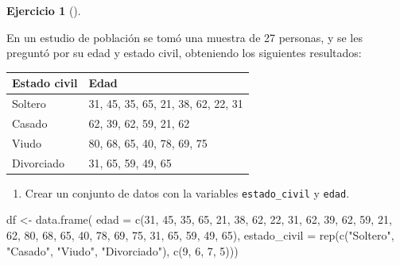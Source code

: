 \documentclass[
  a4paper,
]{scrreport}
\newenvironment{Shaded}{\begin{snugshade}}{\end{snugshade}}
\newcommand{\AttributeTok}[1]{\textcolor[rgb]{0.40,0.45,0.13}{#1}}
\newcommand{\DecValTok}[1]{\textcolor[rgb]{0.68,0.00,0.00}{#1}}
\newcommand{\FunctionTok}[1]{\textcolor[rgb]{0.28,0.35,0.67}{#1}}
\newcommand{\NormalTok}[1]{\textcolor[rgb]{0.00,0.23,0.31}{#1}}
\newcommand{\OtherTok}[1]{\textcolor[rgb]{0.00,0.23,0.31}{#1}}
\newcommand{\StringTok}[1]{\textcolor[rgb]{0.13,0.47,0.30}{#1}}
\providecommand{\tightlist}{%
  \setlength{\itemsep}{0pt}\setlength{\parskip}{0pt}}\usepackage{longtable,booktabs,array}
\theoremstyle{definition}
\newtheorem{exercise}{Ejercicio}[chapter]
\theoremstyle{remark}
\begin{document}
\leavevmode{}%
\begin{exercise}[]\label{exr-4}

En un estudio de población se tomó una muestra de 27 personas, y se les
preguntó por su edad y estado civil, obteniendo los siguientes
resultados:

\begin{longtable}[]{@{}ll@{}}
\toprule()
Estado civil & Edad \\
\midrule()
\endhead
Soltero & 31, 45, 35, 65, 21, 38, 62, 22, 31 \\
Casado & 62, 39, 62, 59, 21, 62 \\
Viudo & 80, 68, 65, 40, 78, 69, 75 \\
Divorciado & 31, 65, 59, 49, 65 \\
\bottomrule()
\end{longtable}

\begin{enumerate}
\def\labelenumi{\alph{enumi}.}
\tightlist
\item
  Crear un conjunto de datos con la variables \texttt{estado\_civil} y
  \texttt{edad}.
\end{enumerate}

\begin{tcolorbox}[enhanced jigsaw, coltitle=black, breakable, bottomtitle=1mm, colbacktitle=quarto-callout-tip-color!10!white, rightrule=.15mm, opacityback=0, opacitybacktitle=0.6, left=2mm, colframe=quarto-callout-tip-color-frame, title=\textcolor{quarto-callout-tip-color}{\faLightbulb}\hspace{0.5em}{Solución}, toprule=.15mm, toptitle=1mm, arc=.35mm, colback=white, titlerule=0mm, bottomrule=.15mm, leftrule=.75mm]

\begin{Shaded}
\begin{Highlighting}[]
\NormalTok{df }\OtherTok{\textless{}{-}} \FunctionTok{data.frame}\NormalTok{(}
    \AttributeTok{edad =} \FunctionTok{c}\NormalTok{(}\DecValTok{31}\NormalTok{, }\DecValTok{45}\NormalTok{, }\DecValTok{35}\NormalTok{, }\DecValTok{65}\NormalTok{, }\DecValTok{21}\NormalTok{, }\DecValTok{38}\NormalTok{, }\DecValTok{62}\NormalTok{, }\DecValTok{22}\NormalTok{, }\DecValTok{31}\NormalTok{, }\DecValTok{62}\NormalTok{, }\DecValTok{39}\NormalTok{, }\DecValTok{62}\NormalTok{, }\DecValTok{59}\NormalTok{, }\DecValTok{21}\NormalTok{, }\DecValTok{62}\NormalTok{, }\DecValTok{80}\NormalTok{, }\DecValTok{68}\NormalTok{, }\DecValTok{65}\NormalTok{, }\DecValTok{40}\NormalTok{, }\DecValTok{78}\NormalTok{, }\DecValTok{69}\NormalTok{, }\DecValTok{75}\NormalTok{, }\DecValTok{31}\NormalTok{, }\DecValTok{65}\NormalTok{, }\DecValTok{59}\NormalTok{, }\DecValTok{49}\NormalTok{, }\DecValTok{65}\NormalTok{), }
    \AttributeTok{estado\_civil =} \FunctionTok{rep}\NormalTok{(}\FunctionTok{c}\NormalTok{(}\StringTok{"Soltero"}\NormalTok{, }\StringTok{"Casado"}\NormalTok{, }\StringTok{"Viudo"}\NormalTok{, }\StringTok{"Divorciado"}\NormalTok{), }\FunctionTok{c}\NormalTok{(}\DecValTok{9}\NormalTok{, }\DecValTok{6}\NormalTok{, }\DecValTok{7}\NormalTok{, }\DecValTok{5}\NormalTok{)))}
\end{Highlighting}
\end{Shaded}


\end{tcolorbox}
\end{exercise}
\end{document}
